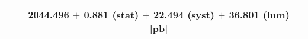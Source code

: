 \begin{tabular}{lc}
\hline
                               & 2044.496 $\pm$ 0.881 (stat) $\pm$ 22.494 (syst) $\pm$ 36.801 (lum) [pb]  \\
\hline
\end{tabular}
